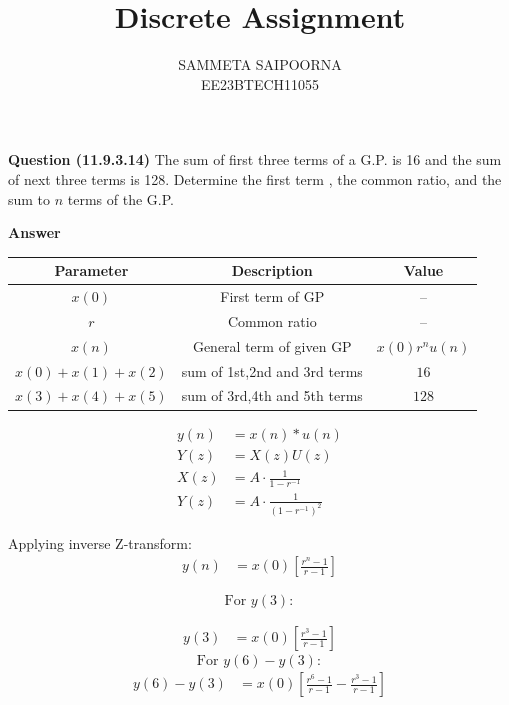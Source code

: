 \documentclass[journal,12pt,onecolumn]{IEEEtran}
\theoremstyle{remark}
\begin{document}
\let\vec\mathbf



\bigskip

\renewcommand{\thefigure}{\theenumi}
\renewcommand{\thetable}{\theenumi}

\title{Discrete Assignment}
\author{SAMMETA SAIPOORNA\\ EE23BTECH11055}
\maketitle
\textbf{Question (11.9.3.14)}
The sum of first three terms of a G.P. is 16 and the sum of next three terms is 128. Determine the first term , the common ratio, and the sum to $n$ terms of the G.P.


\textbf{Answer}

\fi
\begin{tabular}{|c|c|c|}
      \hline
      Parameter & Description & Value\\\hline
      $x(0)$ & First term of GP & --\\\hline
      $r$ & Common ratio & --\\\hline
      $x(n)$ & General term of given GP & $x(0)r^nu(n)$\\\hline
      $x(0)+x(1)+x(2)$ & sum of 1st,2nd and 3rd terms & $16$\\\hline
      $x(3)+x(4)+x(5)$ & sum of 3rd,4th and 5th terms & $128$\\\hline
\end{tabular}

\begin{align}
    y(n) &= x(n) * u(n) \label{eq:11.9.3.14.1} \\
    Y(z) &= X(z) U(z) \label{eq:11.9.3.14.2} \\
    X(z) &= A \cdot \frac{1}{1 - r^{-1}} \label{eq:11.9.3.14.3} \\
    Y(z) &= A \cdot \frac{1}{(1 - r^{-1})^2} \label{eq:11.9.3.14.4}
\end{align}

Applying inverse Z-transform:
\begin{align}
y(n) &= x(0) \left[ \frac{r^n - 1}{r - 1} \right] \label{eq:11.9.3.14.5}
\end{align}

$$
\text{For } y(3):
$$

\begin{align}
y(3) &= x(0) \left[ \frac{r^3 - 1}{r - 1} \right] \label{eq:11.9.3.14.6}
\end{align}
$$
\text{For } y(6) - y(3):
$$
\begin{align}
y(6) - y(3) &= x(0) \left[ \frac{r^6 - 1}{r - 1} - \frac{r^3 - 1}{r - 1} \right] \label{eq:11.9.3.14.7}
\end{align}
\end{document}
